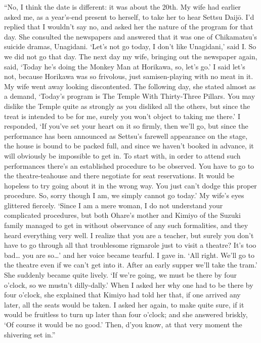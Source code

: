 \documentclass{book}
\begin{document}
``No, I think the date is different: it was about the 20th. My wife had
earlier asked me, as a year's-end present to herself, to take her to
hear Settsu Daijō. I'd replied that I wouldn't say no, and asked her the
nature of the program for that day. She consulted the newspapers and
answered that it was one of Chikamatsu's suicide dramas, Unagidani.
`Let's not go today, I don't like Unagidani,' said I. So we did not go
that day. The next day my wife, bringing out the newspaper again, said,
`Today he's doing the Monkey Man at Horikawa, so, let's go.' I said
let's not, because Horikawa was so frivolous, just samisen-playing with
no meat in it. My wife went away looking discontented. The following
day, she stated almost as a demand, `Today's program is The Temple With
Thirty-Three Pillars. You may dislike the Temple quite as strongly as
you disliked all the others, but since the treat is intended to be for
me, surely you won't object to taking me there.' I responded, `If you've
set your heart on it so firmly, then we'll go, but since the performance
has been announced as Settsu's farewell appearance on the stage, the
house is bound to be packed full, and since we haven't booked in
advance, it will obviously be impossible to get in. To start with, in
order to attend such performances there's an established procedure to be
observed. You have to go to the theatre-teahouse and there negotiate for
seat reservations. It would be hopeless to try going about it in the
wrong way. You just can't dodge this proper procedure. So, sorry though
I am, we simply cannot go today.' My wife's eyes glittered fiercely.
`Since I am a mere woman, I do not understand your complicated
procedures, but both Ohare's mother and Kimiyo of the Suzuki family
managed to get in without observance of any such formalities, and they
heard everything very well. I realize that you are a teacher, but surely
you don't have to go through all that troublesome rigmarole just to
visit a theatre? It's too bad\ldots{} you are so\ldots{}' and her voice
became tearful. I gave in. `All right. We'll go to the theatre even if
we can't get into it. After an early supper we'll take the tram.' She
suddenly became quite lively. `If we're going, we must be there by four
o'clock, so we mustn't dilly-dally.' When I asked her why one had to be
there by four o'clock, she explained that Kimiyo had told her that, if
one arrived any later, all the seats would be taken. I asked her again,
to make quite sure, if it would be fruitless to turn up later than four
o'clock; and she answered briskly, `Of course it would be no good.'
Then, d'you know, at that very moment the shivering set in.''
\end{document}
